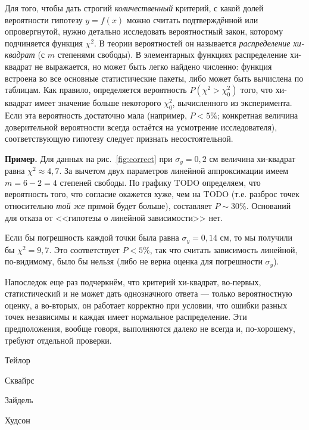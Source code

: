 \documentclass[10pt]{article}
\begin{document}
Для того, чтобы дать строгий \emph{количественный}
критерий, с какой долей вероятности гипотезу $y=f\!\left(x\right)$
можно считать подтверждённой или опровергнутой, нужно детально исследовать
вероятностный закон, которому подчиняется функция $\chi^{2}$. В теории
вероятностей он называется \emph{распределение хи-квадрат}
(с $m$ степенями свободы). В элементарных функциях распределение
хи-квадрат не выражается, но может быть легко найдено численно: функция
встроена во все основные статистические пакеты, либо может быть вычислена
по таблицам. Как правило, определяется вероятность 
$P\left(\chi^{2}>\chi_{0}^{2}\right)$
того, что хи-квадрат имеет значение больше некоторого $\chi_{0}^{2}$,
вычисленного из эксперимента. Если эта вероятность достаточно мала
(например, $P<5\%$; конкретная величина доверительной вероятности
всегда остаётся на усмотрение исследователя), соответствующую гипотезу
следует признать несостоятельной.

{\footnotesize
\textbf{Пример.} Для данных на рис.~\ref{fig:correct}
при $\sigma_{y}=0{,}2$ см величина хи-квадрат равна $\chi^{2}\approx4{,}7$.
За вычетом двух параметров линейной аппроксимации имеем $m=6-2=4$
степеней свободы. По графику TODO определяем, что вероятность того,
что согласие окажется хуже, чем на TODO (т.е. разброс точек относительно
\emph{той же} прямой будет больше),
составляет $P\sim30\%$. Оснований для отказа от <<гипотезы
о линейной зависимости>> нет.

Если бы погрешность каждой точки была равна $\sigma_{y}=0{,}14$
см, то мы получили бы $\chi^{2}=9{,}7$. Это соответствует $P<5\%$,
так что считать зависимость линейной, по-видимому, было бы нельзя
(либо не верна оценка для погрешности $\sigma_{y}$).\par
}%

Напоследок еще раз подчеркнём, что критерий хи-квадрат, во-первых,
статистический и не может дать однозначного ответа --- только
вероятностную оценку, а во-вторых, он работает корректно при условии,
что ошибки разных точек независимы и каждая имеет нормальное распределение.
Эти предположения, вообще говоря, выполняются далеко не всегда и,
по-хорошему, требуют отдельной проверки.
\begin{thebibliography}{1}
Тейлор

Сквайрс

Зайдель

Худсон
\end{thebibliography}
\end{document}
